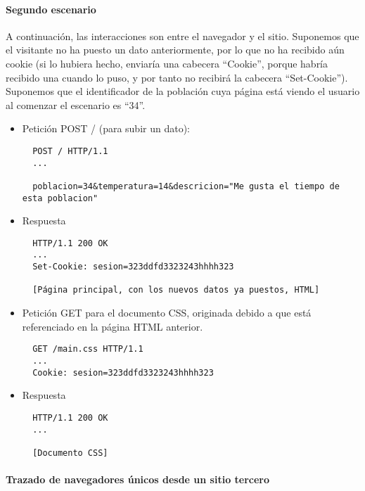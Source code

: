 \paragraph{Segundo escenario}

A continuación, las interacciones son entre el navegador y el sitio. Suponemos que el visitante no ha puesto un dato anteriormente, por lo que no ha recibido aún cookie (si lo hubiera hecho, enviaría una cabecera ``Cookie'', porque habría recibido una cuando lo puso, y por tanto no recibirá la cabecera ``Set-Cookie''). Suponemos que el identificador de la población cuya página está viendo el usuario al comenzar el escenario es ``34''.

\begin{itemize}
\item Petición POST / (para subir un dato):

\begin{verbatim}
  POST / HTTP/1.1
  ...
  
  poblacion=34&temperatura=14&descricion="Me gusta el tiempo de esta poblacion"
\end{verbatim}

\item Respuesta

\begin{verbatim}
  HTTP/1.1 200 OK
  ...
  Set-Cookie: sesion=323ddfd3323243hhhh323

  [Página principal, con los nuevos datos ya puestos, HTML]
\end{verbatim}

\item Petición GET para el documento CSS, originada debido a que está referenciado en la página HTML anterior.

\begin{verbatim}
  GET /main.css HTTP/1.1
  ...
  Cookie: sesion=323ddfd3323243hhhh323
\end{verbatim}

\item Respuesta

\begin{verbatim}
  HTTP/1.1 200 OK
  ...

  [Documento CSS]
\end{verbatim}

\end{itemize}


\paragraph{Trazado de navegadores únicos desde un sitio tercero}

